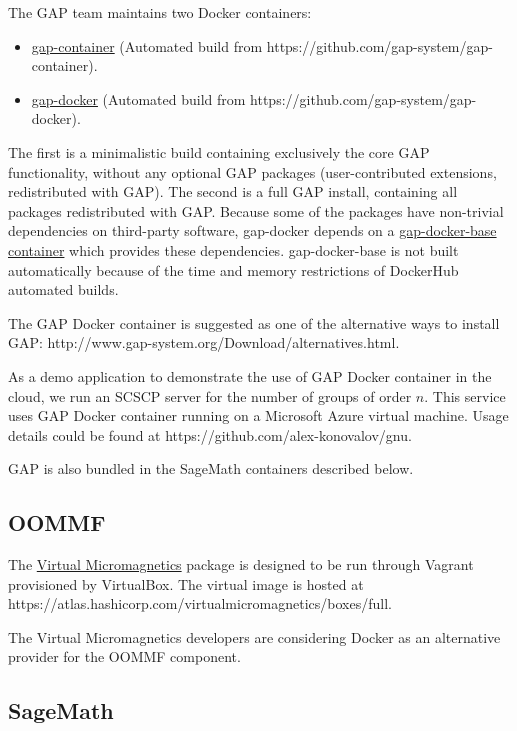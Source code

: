 The GAP team maintains two Docker containers:

\begin{itemize}
\tightlist
\item
  \href{https://hub.docker.com/r/gapsystem/gap-container/}{gap-container}
  (Automated build from https://github.com/gap-system/gap-container).
\item
  \href{https://hub.docker.com/r/gapsystem/gap-docker/}{gap-docker}
  (Automated build from https://github.com/gap-system/gap-docker).
\end{itemize}

The first is a minimalistic build containing exclusively the core GAP
functionality, without any optional GAP packages (user-contributed
extensions, redistributed with GAP). The second is a full GAP install,
containing all packages redistributed with GAP. Because some of the
packages have non-trivial dependencies on third-party software,
gap-docker depends on a
\href{https://hub.docker.com/r/gapsystem/gap-docker-base/}{gap-docker-base
container} which provides these dependencies. gap-docker-base is not
built automatically because of the time and memory restrictions of
DockerHub automated builds.

The GAP Docker container is suggested as one of the alternative ways to
install GAP: http://www.gap-system.org/Download/alternatives.html.

As a demo application to demonstrate the use of GAP Docker container in
the cloud, we run an SCSCP server for the number of groups of order
\(n\). This service uses GAP Docker container running on a Microsoft
Azure virtual machine. Usage details could be found at
https://github.com/alex-konovalov/gnu.

GAP is also bundled in the SageMath containers described below.

\subsection{OOMMF}\label{oommf}

The \href{http://fangohr.github.io/virtualmicromagnetics/}{Virtual
Micromagnetics} package is designed to be run through Vagrant
provisioned by VirtualBox. The virtual image is hosted at
https://atlas.hashicorp.com/virtualmicromagnetics/boxes/full.

The Virtual Micromagnetics developers are considering Docker as an
alternative provider for the OOMMF component.

\subsection{SageMath}\label{sagemath}

